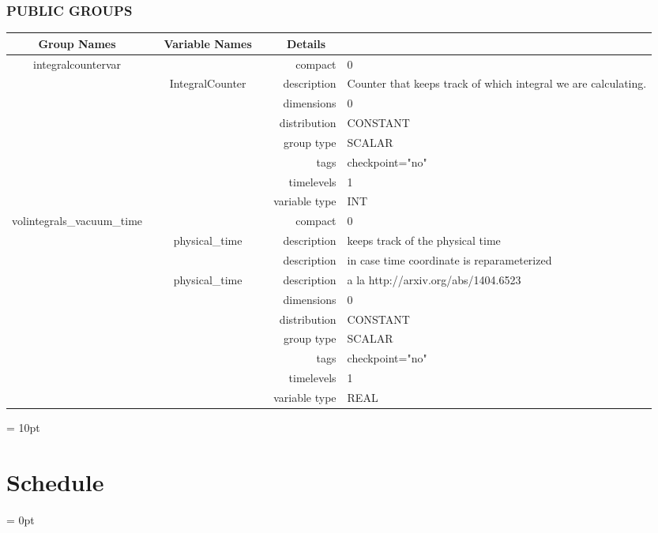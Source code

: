 \vspace{5mm}\subsubsection{PUBLIC GROUPS}

\vspace{5mm}

\begin{tabular*}{150mm}{|c|c@{\extracolsep{\fill}}|rl|} \hline 
~ {\bf Group Names} ~ & ~ {\bf Variable Names} ~  &{\bf Details} ~ & ~\\ 
\hline 
integralcountervar &  & compact & 0 \\ 
 & IntegralCounter & description & Counter that keeps track of which integral we are calculating. \\ 
 &  & dimensions & 0 \\ 
 &  & distribution & CONSTANT \\ 
 &  & group type & SCALAR \\ 
 &  & tags & checkpoint="no" \\ 
 &  & timelevels & 1 \\ 
 &  & variable type & INT \\ 
\hline 
volintegrals\_vacuum\_time &  & compact & 0 \\ 
 & physical\_time & description & keeps track of the physical time \\ 
& ~ & description &  in case time coordinate is reparameterized \\ 
 & physical\_time & description &  a la http://arxiv.org/abs/1404.6523 \\ 
 &  & dimensions & 0 \\ 
 &  & distribution & CONSTANT \\ 
 &  & group type & SCALAR \\ 
 &  & tags & checkpoint="no" \\ 
 &  & timelevels & 1 \\ 
 &  & variable type & REAL \\ 
\hline 
\end{tabular*} 



\vspace{5mm}\parskip = 10pt 

\section{Schedule} 


\parskip = 0pt


